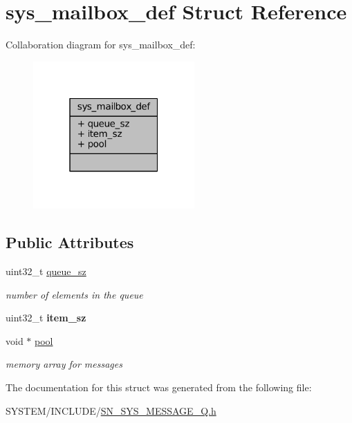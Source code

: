 \hypertarget{structsys__mailbox__def}{}\section{sys\+\_\+mailbox\+\_\+def Struct Reference}
\label{structsys__mailbox__def}


Collaboration diagram for sys\+\_\+mailbox\+\_\+def\+:\nopagebreak
\begin{figure}[H]
\begin{center}
\leavevmode
\includegraphics[width=175pt]{structsys__mailbox__def__coll__graph}
\end{center}
\end{figure}
\subsection*{Public Attributes}
\begin{DoxyCompactItemize}
\item 
\mbox{\label{structsys__mailbox__def_a724eebc67775e287f31ff4ba4bdc7de4}} 
uint32\+\_\+t \hyperlink{structsys__mailbox__def_a724eebc67775e287f31ff4ba4bdc7de4}{queue\+\_\+sz}
\begin{DoxyCompactList}\small\item\em number of elements in the queue \end{DoxyCompactList}\item 
\mbox{\label{structsys__mailbox__def_a4bf79a438374885ef62c8e27267d4fa2}} 
uint32\+\_\+t {\bfseries item\+\_\+sz}
\item 
\mbox{\label{structsys__mailbox__def_a4838cee576a4f7db6ca0c4bf59b32a5c}} 
void $\ast$ \hyperlink{structsys__mailbox__def_a4838cee576a4f7db6ca0c4bf59b32a5c}{pool}
\begin{DoxyCompactList}\small\item\em memory array for messages \end{DoxyCompactList}\end{DoxyCompactItemize}


The documentation for this struct was generated from the following file\+:\begin{DoxyCompactItemize}
\item 
S\+Y\+S\+T\+E\+M/\+I\+N\+C\+L\+U\+D\+E/\hyperlink{SN__SYS__MESSAGE__Q_8h}{S\+N\+\_\+\+S\+Y\+S\+\_\+\+M\+E\+S\+S\+A\+G\+E\+\_\+\+Q.\+h}\end{DoxyCompactItemize}
